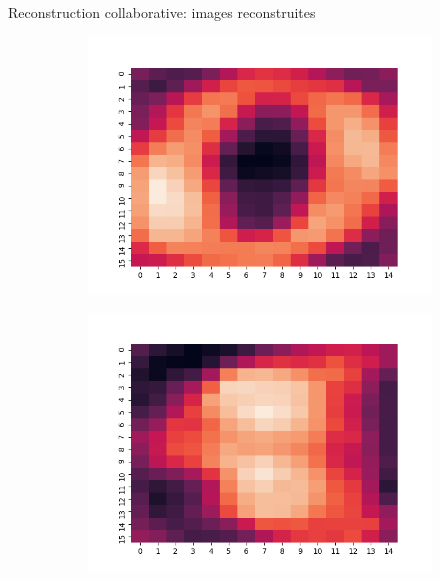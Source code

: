 \documentclass[hyperref={pdfpagelabels=false}]{beamer}
\begin{document}
    \begin{frame}{Reconstruction collaborative: images reconstruites}
        \begin{figure}[h]
            \centering
            \begin{subfigure}[c]{0.18\textwidth}
                \includegraphics[scale=.12]{0}
            \end{subfigure}
            \begin{subfigure}[c]{0.18\textwidth}
                \includegraphics[scale=.12]{1}
            \end{subfigure}
            \begin{subfigure}[c]{0.18\textwidth}

\end{subfigure}
\end{figure}
\end{frame}
\end{document}
